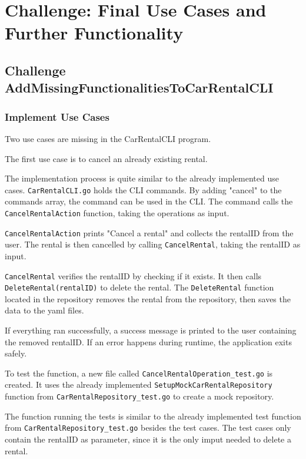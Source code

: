\section{Challenge: Final Use Cases and Further Functionality}
\label{sec:challenge_final_use_cases_and_further_functionality}

\subsection{Challenge AddMissingFunctionalitiesToCarRentalCLI}
\label{subsec:challenge_addmissingfunctionalitiestocarrentalcli}

\subsubsection*{Implement Use Cases}
Two use cases are missing in the CarRentalCLI program.

The first use case is to cancel an already existing rental.

The implementation process is quite similar to the already implemented use cases.
\texttt{CarRentalCLI.go} holds the CLI commands.
By adding "cancel" to the commands array, the command can be used in the CLI.
The command calls the \texttt{CancelRentalAction} function, taking the operations as input.

\texttt{CancelRentalAction} prints "Cancel a rental" and collects the rentalID from the user.
The rental is then cancelled by calling \texttt{CancelRental}, taking the rentalID as input.

\texttt{CancelRental} verifies the rentalID by checking if it exists. \hfill \linebreak
It then calls \texttt{DeleteRental(rentalID)} to delete the rental.
The \texttt{DeleteRental} function located in the repository removes the rental from the repository, then saves the data to the yaml files.

If everything ran successfully, a success message is printed to the user containing the removed rentalID.
If an error happens during runtime, the application exits safely.

To test the function, a new file called \texttt{CancelRentalOperation\_test.go} is created.
It uses the already implemented \texttt{SetupMockCarRentalRepository} function from \hfill \linebreak \texttt{CarRentalRepository\_test.go} to create a mock repository.

The function running the tests is similar to the already implemented test function from \texttt{CarRentalRepository\_test.go} besides the test cases.
The test cases only contain the rentalID as parameter, since it is the only imput needed to delete a rental.

